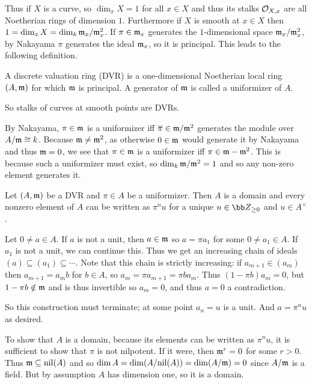 Thus if $X$ is a curve, so $\dim_xX=1$ for all $x\in X$ and thus its stalks ${{\cal O}}_{X,x}$ are all Noetherian rings of dimension $1$.
Furthermore if $X$ is smooth at $x\in X$ then $1=\dim_xX=\dim_k{{\frak m}}_x/{{\frak m}}_x^2$.
If $\pi\in{{\frak m}}_x$ generates the $1$-dimensional space ${{\frak m}}_x/{{\frak m}}_x^2$, by Nakayama $\pi$ generates the ideal ${{\frak m}}_x$, so it is principal.
This leads to the following definition.

\bdefn

    A {\emphcolor discrete valuation ring} ({\emphcolor DVR}) is a one-dimensional Noetherian local ring $(A,{{\frak m}})$ for which ${{\frak m}}$ is principal.
    A generator of ${{\frak m}}$ is called a {\emphcolor uniformizer} of $A$.

\edefn

So stalks of curves at smooth points are DVRs.

By Nakayama, $\pi\in{{\frak m}}$ is a uniformizer iff ${\overline{\pi}}\in{{\frak m}}/{{\frak m}}^2$ generates the module over $A/{{\frak m}}\cong k$.
Because ${{\frak m}}\neq{{\frak m}}^2$, as otherwise $0\in{{\frak m}}$ would generate it by Nakayama and thus ${{\frak m}}=0$, we see that $\pi\in{{\frak m}}$ is a uniformizer iff $\pi\in{{\frak m}}-{{\frak m}}^2$.
This is because such a uniformizer must exist, so $\dim_k{{\frak m}}/{{\frak m}}^2=1$ and so any non-zero element generates it.

\blemm

    Let $(A,{{\frak m}})$ be a DVR and $\pi\in A$ be a uniformizer.
    Then $A$ is a domain and every nonzero element of $A$ can be written as $\pi^nu$ for a unique $n\in\bZ_{\geq0}$ and $u\in A^\times$.

\elemm

\bproof

    Let $0\neq a\in A$.
    If $a$ is not a unit, then $a\in{{\frak m}}$ so $a=\pi a_1$ for some $0\neq a_1\in A$.
    If $a_1$ is not a unit, we can continue this.
    Thus we get an increasing chain of ideals $(a)\subseteq(a_1)\subseteq\cdots$.
    Note that this chain is strictly increasing: if $a_{m+1}\in(a_m)$ then $a_{m+1}=a_mb$ for $b\in A$, so $a_m=\pi a_{m+1}=\pi ba_m$.
    Thus $(1-\pi b)a_m=0$, but $1-\pi b\notin{{\frak m}}$ and is thus invertible so $a_m=0$, and thus $a=0$ a contradiction.

    So this construction must terminate; at some point $a_n=u$ is a unit.
    And $a=\pi^nu$ as desired.

    To show that $A$ is a domain, because its elements can be written as $\pi^nu$, it is sufficient to show that $\pi$ is not nilpotent.
    If it were, then ${{\frak m}}^r=0$ for some $r>0$.
    Thus ${{\frak m}}\subseteq{\rm nil}(A)$ and so $\dim A=\dim(A/{\rm nil}(A))=\dim(A/{{\frak m}})=0$ since $A/{{\frak m}}$ is a field.
    But by assumption $A$ has dimension one, so it is a domain.

